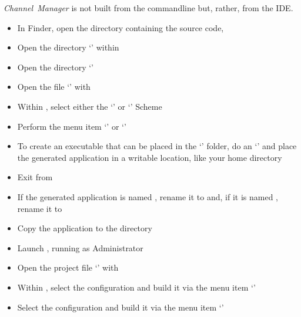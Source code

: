 \tertiaryEnd{}
\secondaryEnd{}
\textit{Channel~Manager} is not built from the command\longDash{}line but, rather, from
the IDE.
\begin{itemize}
\item In Finder, open the directory containing the \mplusm{} source code, 
\item\exSp{} Open the directory `' within
\item\exSp{} Open the directory `'
\item\exSp{} Open the file `' with 
\item\exSp{} Within , select either the `' or
`' Scheme
\item\exSp{} Perform the menu item `' or
`'
\item\exSp{} To create an executable that can be placed in the `'
folder, do an `'
and place the generated application in a writable location, like your home directory
\item\exSp{} Exit from 
\item\exSp{} If the generated application is named , rename
it to  and, if it is named ,
rename it to 
\item\exSp{} Copy the  application to the 
directory
\end{itemize}
\tertiaryEnd{}
\begin{itemize}
\item Launch , running as Administrator
\item\exSp{} Open the project file
`' with
\item\exSp{} Within , select the  configuration and
build it via the menu item `'
\item\exSp{} Select the  configuration and build it via the menu item
`'
\end{itemize}
